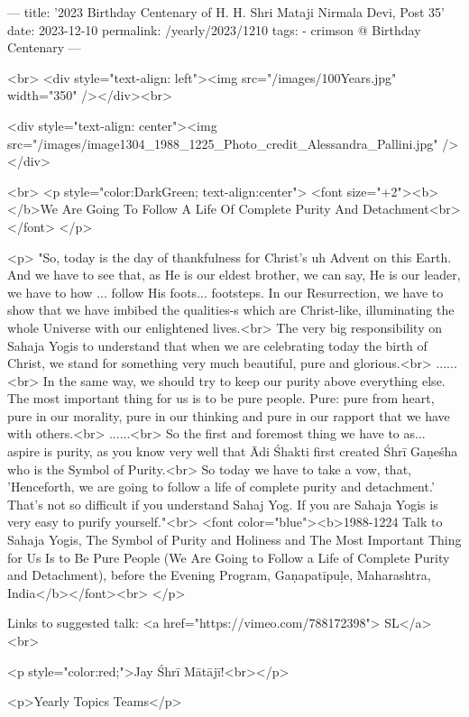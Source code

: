 ---
title: '2023 Birthday Centenary of H. H. Shri Mataji Nirmala Devi, Post 35'
date: 2023-12-10
permalink: /yearly/2023/1210
tags:
  - crimson @ Birthday Centenary
---

<br>
<div style="text-align: left"><img src="/images/100Years.jpg" width="350" /></div><br>

<div style="text-align: center"><img src="/images/image1304_1988_1225_Photo_credit_Alessandra_Pallini.jpg" /></div>

<br>
<p style="color:DarkGreen; text-align:center">
<font size="+2"><b></b>We Are Going To Follow A Life Of Complete Purity And Detachment<br></font>
</p>

<p>
"So, today is the day of thankfulness for Christ's uh Advent on this Earth. And we have to see that, as He is our eldest brother, we can say, He is our leader, we have to how ... follow His foots... footsteps. In our Resurrection, we have to show that we have imbibed the qualities-s which are Christ-like, illuminating the whole Universe with our enlightened lives.<br>
The very big responsibility on Sahaja Yogis to understand that when we are celebrating today the birth of Christ, we stand for something very much beautiful, pure and glorious.<br>
......<br>
In the same way, we should try to keep our purity above everything else. The most important thing for us is to be pure people. Pure: pure from heart, pure in our morality, pure in our thinking and pure in our rapport that we have with others.<br>
......<br>
So the first and foremost thing we have to as... aspire is purity, as you know very well that Ādi Śhakti first created Śhrī Gaṇeśha who is the Symbol of Purity.<br>
So today we have to take a vow, that, 'Henceforth, we are going to follow a life of complete purity and detachment.' That's not so difficult if you understand Sahaj Yog. If you are Sahaja Yogis is very easy to purify yourself."<br>
<font color="blue"><b>1988-1224 Talk to Sahaja Yogis, The Symbol of Purity and Holiness and The Most Important Thing for Us Is to Be Pure People (We Are Going to Follow a Life of Complete Purity and Detachment), before the Evening Program, Gaṇapatīpuḷe, Maharashtra, India</b></font><br>
</p>

Links to suggested talk: <a href="https://vimeo.com/788172398"> SL</a><br>

<p style="color:red;">Jay Śhrī Mātājī!<br></p>

<p>Yearly Topics Teams</p>